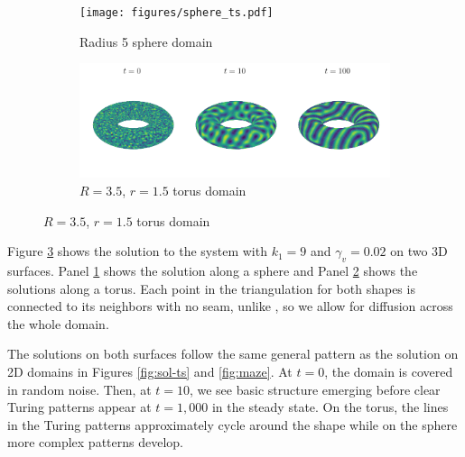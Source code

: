 \begin{figure}[t]
    \centering
    \caption{Solution to the reaction-diffusion system on 3D surfaces}

    \begin{subfigure}{\textwidth}
        \centering
        \texttt{[image: figures/sphere\_ts.pdf]}
        \caption{Radius 5 sphere domain}
        \label{subfig:sphere}
    \end{subfigure}

    \begin{subfigure}{\textwidth}
        \centering
        \includegraphics{figures/torus_ts.pdf}
        \caption{$R = 3.5$, $r = 1.5$ torus domain}
        \label{subfig:torus}
    \end{subfigure}

    \label{fig:3d-shapes}
\end{figure}

Figure \ref{fig:3d-shapes} shows the solution to the system with $k_1 = 9$ and $\gamma_v = 0.02$ on two 3D surfaces. Panel \ref{subfig:sphere} shows the solution along a sphere and Panel \ref{subfig:torus} shows the solutions along a torus. Each point in the triangulation for both shapes is connected to its neighbors with no seam, unlike \autocite{leon2021full}, so we allow for diffusion across the whole domain.

The solutions on both surfaces follow the same general pattern as the solution on 2D domains in Figures \ref{fig:sol-ts} and \ref{fig:maze}. At $t = 0$, the domain is covered in random noise. Then, at $t = 10$, we see basic structure emerging before clear Turing patterns appear at $t = 1,000$ in the steady state. On the torus, the lines in the Turing patterns approximately cycle around the shape while on the sphere more complex patterns develop.
